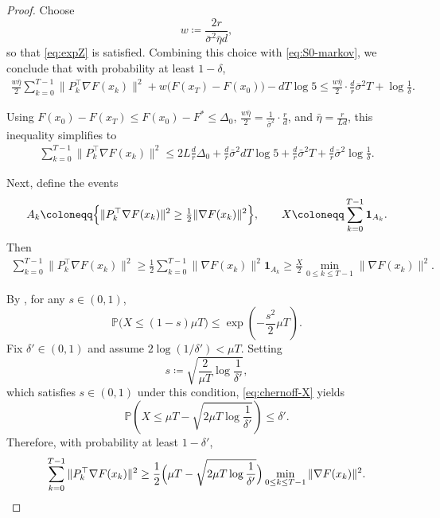\documentclass[10pt]{article}
\begin{document}
\begin{proof}
Choose
\[
w \coloneqq \frac{2r}{\bar{\sigma}^2 \bar{\eta} d},
\]
so that
\eqref{eq:expZ} is satisfied.
Combining this choice with \eqref{eq:S0-markov}, we conclude that with probability
at least $1-\delta$,
\begin{align*}
\frac{w\bar{\eta}}{2}\sum_{k=0}^{T-1}\|P_k^\top\nabla F(x_k)\|^2
+w\bigl(F(x_T)-F(x_0)\bigr)
-dT\log 5
\le
\frac{w\bar{\eta}}{2}\cdot\frac{d}{r}\bar{\sigma}^2 T
+\log\frac{1}{\delta}.
\end{align*}

Using $F(x_0)-F(x_T)\le F(x_0)-F^\ast\leq\Delta_0$,
$\frac{w\bar{\eta}}{2}=\frac{1}{\bar{\sigma}^2}\cdot\frac{r}{d}$,
and $\bar{\eta}=\frac{r}{Ld}$, this inequality simplifies to
\begin{align}
\sum_{k=0}^{T-1}\|P_k^\top\nabla F(x_k)\|^2
\le
2L\frac{d}{r}\Delta_0
+\frac{d}{r}\bar{\sigma}^2 dT\log 5
+\frac{d}{r}\bar{\sigma}^2 T
+\frac{d}{r}\bar{\sigma}^2\log\frac{1}{\delta}.
\label{eq:sum-proj-grad}
\end{align}

Next, define the events
\[
A_k \coloneqq
\Bigl\{
\|P_k^\top\nabla F(x_k)\|^2
\ge \tfrac{1}{2}\|\nabla F(x_k)\|^2
\Bigr\},
\qquad
X \coloneqq \sum_{k=0}^{T-1}\mathbf{1}_{A_k}.
\]
Then
\begin{align}
\sum_{k=0}^{T-1}\|P_k^\top\nabla F(x_k)\|^2
\ge
\frac{1}{2}\sum_{k=0}^{T-1}\|\nabla F(x_k)\|^2\mathbf{1}_{A_k}
\ge
\frac{X}{2}\min_{0\le k\le T-1}\|\nabla F(x_k)\|^2 .
\label{eq:lower-by-X}
\end{align}

By , for any $s\in(0,1)$,
\begin{equation}
\mathbb{P}\bigl(X\le (1-s)\mu T\bigr)
\le \exp\!\left(-\frac{s^2}{2}\mu T\right).
\label{eq:chernoff-X}
\end{equation}
Fix $\delta'\in(0,1)$ and assume $2\log(1/\delta')<\mu T$.
Setting
\[
s \coloneqq \sqrt{\frac{2}{\mu T}\log\frac{1}{\delta'}},
\]
which satisfies $s\in(0,1)$ under this condition, \eqref{eq:chernoff-X} yields
\begin{equation}
\mathbb{P}\!\left(
X\le \mu T-\sqrt{2\mu T\log\frac{1}{\delta'}}
\right)\le \delta' .
\label{eq:X-lower}
\end{equation}
Therefore, with probability at least $1-\delta'$,
\begin{align}
\sum_{k=0}^{T-1}\|P_k^\top\nabla F(x_k)\|^2
\ge
\frac{1}{2}\Bigl(
\mu T-\sqrt{2\mu T\log\frac{1}{\delta'}}
\Bigr)
\min_{0\le k\le T-1}\|\nabla F(x_k)\|^2 .
\label{eq:proj-lower}
\end{align}


\end{proof}
\end{document}
